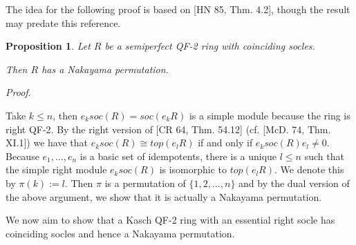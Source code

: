 \documentclass[11pt]{article}
\theoremstyle{plain}
\newtheorem{Prop}[veta]{Proposition}
\theoremstyle{remark}
\theoremstyle{plain}
\newenvironment{Proof}{
  \par\medskip\noindent
  \textit{Proof}.
}{
\newline
\rightline{$\qedsymbol$}
}
\begin{document}
The idea for the following proof is based on [HN 85, Thm. 4.2], though the result may predate this reference.
\begin{Prop}\label{PropSocsCoincide}
    Let $R$ be a semiperfect QF-2 ring with coinciding socles.

    Then $R$ has a Nakayama permutation.
\end{Prop}
\begin{Proof}
Take $k\leq n$, then $e_ksoc(R)=soc(e_kR)$ is a simple module because the ring is right QF-2. By the right version of [CR 64, Thm. 54.12] (cf. [McD. 74, Thm. XI.1]) we have that $e_ksoc(R)\cong top(e_lR)$ if and only if $e_ksoc(R)e_l\neq 0$. Because $e_1, \dots, e_n$ is a basic set of idempotents, there is a unique $l\leq n$ such that the simple right module $e_ksoc(R)$ is isomorphic to $top(e_lR)$. We denote this by $\pi(k):=l$. Then $\pi$ is a permutation of $\{1, 2, \dots, n\}$ and by the dual version of the above argument, we show that it is actually a Nakayama permutation.    
\end{Proof}

We now aim to show that a Kasch QF-2 ring with an essential right socle has coinciding socles and hence a Nakayama permutation. 
\end{document}
